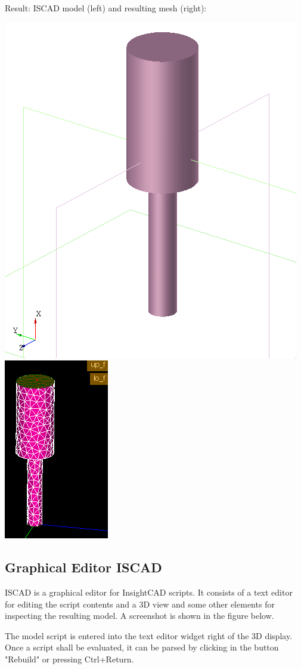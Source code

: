 Result: ISCAD model (left) and resulting mesh (right):

\includegraphics[width=0.45\linewidth]{figs/iscad/gmsh_example_iscad.png}
\includegraphics[width=0.45\linewidth]{figs/iscad/gmsh_example_mesh.png}

\subsection{Graphical Editor ISCAD}

ISCAD is a graphical editor for InsightCAD scripts. It
consists of a text editor for editing the script contents and a 3D view
and some other elements for inspecting the resulting model. A screenshot
is shown in the figure below.

The model script is entered into the text editor widget right of the 3D
display. Once a script shall be evaluated, it can be parsed by clicking
in the button "Rebuild" or pressing Ctrl+Return.

